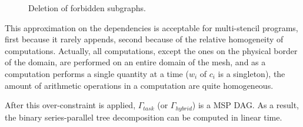 \begin{figure}[h!]
\begin{center}
\hspace{50pt}
\caption{Deletion of forbidden subgraphs.}
\label{fig:allover}
\end{center}
\end{figure}

This approximation on the dependencies is acceptable for multi-stencil programs, first because it rarely appends, second because of the relative homogeneity of computations. Actually, all computations, except the ones on the physical border of the domain, are performed on an entire domain of the mesh, and as a computation performs a single quantity at a time ($w_i$ of $c_i$ is a singleton), the amount of arithmetic operations in a computation are quite homogeneous.

After this over-constraint is applied, $\Gamma_{task}$ (or $\Gamma_{hybrid}$) is a MSP DAG. As a result, the binary series-parallel tree decomposition can be computed in linear time.
